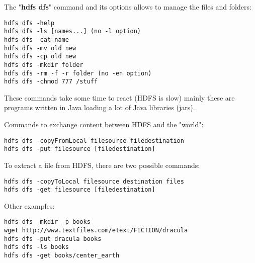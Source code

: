 \documentclass{beamer}[10pt, usepdftitle=false handout]
\begin{document}
	\begin{frame}[fragile]
	
The "\textbf{hdfs dfs}" command and its options allows to manage the files and folders:
\vspace*{0.6em}

\begin{verbatim}
hdfs dfs -help
hdfs dfs -ls [names...] (no -l option) 
hdfs dfs -cat name 
hdfs dfs -mv old new
hdfs dfs -cp old new
hdfs dfs -mkdir folder 
hdfs dfs -rm -f -r folder (no -en option)
hdfs dfs -chmod 777 /stuff
\end{verbatim}

These commands take some time to react (HDFS is slow) mainly these are programs written in Java loading a lot of Java libraries (jars). 
		
\end{frame}
\begin{frame}[fragile]
	
Commands to exchange content between HDFS and the "world":
\vspace*{0.6em}

\begin{verbatim}
hdfs dfs -copyFromLocal filesource filedestination
hdfs dfs -put filesource [filedestination] 
\end{verbatim}

To extract a file from HDFS, there are two possible commands:
\begin{verbatim}
hdfs dfs -copyToLocal filesource destination files
hdfs dfs -get filesource [filedestination]
\end{verbatim}
 
Other examples:
\begin{verbatim}
hdfs dfs -mkdir -p books
wget http://www.textfiles.com/etext/FICTION/dracula
hdfs dfs -put dracula books
hdfs dfs -ls books
hdfs dfs -get books/center_earth 
\end{verbatim}
	
\end{frame}
\end{document}
